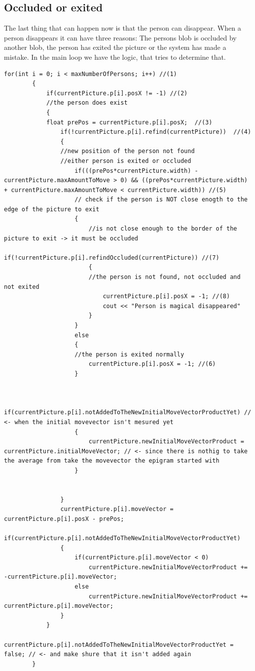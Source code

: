 \subsection{Occluded or exited}
The last thing that can happen now is that the person can disappear. When a person disappears it can have three reasons: The persons blob is occluded by another blob, the person has exited the picture or the system has made a mistake. In the main loop we have the logic, that tries to determine that. 
\begin{lstlisting}
for(int i = 0; i < maxNumberOfPersons; i++) //(1)
		{
			if(currentPicture.p[i].posX != -1) //(2)
			//the person does exist
			{
			float prePos = currentPicture.p[i].posX;  //(3)
				if(!currentPicture.p[i].refind(currentPicture))  //(4)
				{
				//new position of the person not found
				//either person is exited or occluded
					if(((prePos*currentPicture.width) - currentPicture.maxAmountToMove > 0) && ((prePos*currentPicture.width) + currentPicture.maxAmountToMove < currentPicture.width)) //(5)
					// check if the person is NOT close enogth to the edge of the picture to exit
					{
						//is not close enough to the border of the picture to exit -> it must be occluded
						if(!currentPicture.p[i].refindOccluded(currentPicture)) //(7)
						{
						//the person is not found, not occluded and not exited 
							currentPicture.p[i].posX = -1; //(8)
							cout << "Person is magical disappeared"
						}
					}
					else 
					{
					//the person is exited normally 
						currentPicture.p[i].posX = -1; //(6)
					}


					if(currentPicture.p[i].notAddedToTheNewInitialMoveVectorProductYet) // <- when the initial movevector isn't mesured yet
					{
						currentPicture.newInitialMoveVectorProduct = currentPicture.initialMoveVector; // <- since there is nothig to take the average from take the movevector the epigram started with
					}


				}
				currentPicture.p[i].moveVector = currentPicture.p[i].posX - prePos;
				if(currentPicture.p[i].notAddedToTheNewInitialMoveVectorProductYet)
				{
					if(currentPicture.p[i].moveVector < 0)
						currentPicture.newInitialMoveVectorProduct += -currentPicture.p[i].moveVector;
					else
						currentPicture.newInitialMoveVectorProduct += currentPicture.p[i].moveVector;
				}
			}
			currentPicture.p[i].notAddedToTheNewInitialMoveVectorProductYet = false; // <- and make shure that it isn't added again
		}
\end{lstlisting}

